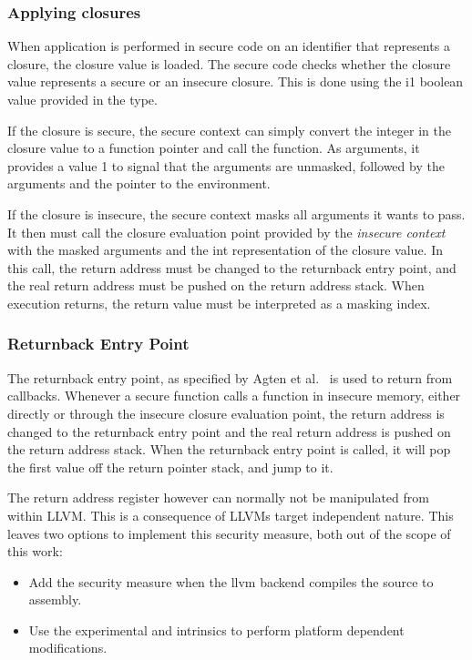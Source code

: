 \subsubsection{Applying closures}
When application is performed in secure code on an identifier that represents a closure, the closure value is loaded.
The secure code checks whether the closure value represents a secure or an insecure closure.
This is done using the i1 boolean value provided in the  type.

If the closure is secure, the secure context can simply convert the integer in the closure value to a function pointer and call the function.
As arguments, it provides a value 1 to signal that the arguments are unmasked, followed by the arguments and the pointer to the environment.

If the closure is insecure, the secure context masks all arguments it wants to pass. It then must call the closure evaluation point provided by the \emph{insecure context} with the masked arguments and the int representation of the closure value.
In this call, the return address must be changed to the returnback entry point, and the real return address must be pushed on the return address stack.
When execution returns, the return value must be interpreted as a masking index.

\subsubsection{Returnback Entry Point}
The returnback entry point, as specified by Agten et al.~\cite{Agten:2012:SCM:2354412.2355247} is used to return from callbacks.
Whenever a secure function calls a function in insecure memory, either directly or through the insecure closure evaluation point, the return address is changed to the returnback entry point and the real return address is pushed on the return address stack. When the returnback entry point is called, it will pop the first value off the return pointer stack, and jump to it.

The return address register however can normally not be manipulated from within LLVM. This is a consequence of LLVMs target independent nature.
This leaves two options to implement this security measure, both out of the scope of this work:
\begin{itemize}
\item 
Add the security measure when the llvm backend compiles the \LLVMIR source to assembly.

\item 
Use the experimental  and  intrinsics to perform platform dependent modifications.
\end{itemize}


